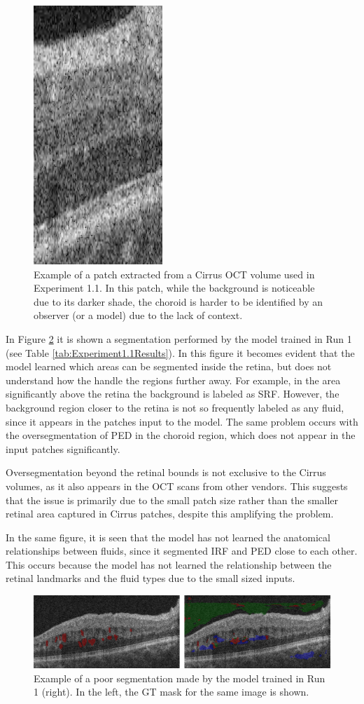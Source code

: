 \begin{figure}[!ht]
	\centering
	\includegraphics[width=0.18\linewidth]{figures/CirrusPatchExample.png}
	\caption{Example of a patch extracted from a Cirrus OCT volume used in Experiment 1.1. In this patch, while the background is noticeable due to its darker shade, the choroid is harder to be identified by an observer (or a model) due to the lack of context.}
	\label{fig:CirrusPatchExample}
\end{figure}

In Figure \ref{fig:Experiment11Segmentation} it is shown a segmentation performed by the model trained in Run 1 (see Table \ref{tab:Experiment1.1Results}). In this figure it becomes evident that the model learned which areas can be segmented inside the retina, but does not understand how the handle the regions further away. For example, in the area significantly above the retina the background is labeled as SRF. However, the background region closer to the retina is not so frequently labeled as any fluid, since it appears in the patches input to the model. The same problem occurs with the oversegmentation of PED in the choroid region, which does not appear in the input patches significantly.
\par
Oversegmentation beyond the retinal bounds is not exclusive to the Cirrus volumes, as it also appears in the OCT scans from other vendors. This suggests that the issue is primarily due to the small patch size rather than the smaller retinal area captured in Cirrus patches, despite this amplifying the problem. 
\par
In the same figure, it is seen that the model has not learned the anatomical relationships between fluids, since it segmented IRF and PED close to each other. This occurs because the model has not learned the relationship between the retinal landmarks and the fluid types due to the small sized inputs.

\begin{figure}[!ht]
	\centering
	\includegraphics[width=1.0\linewidth]{figures/Experiment11Segmentation.png}
	\caption{Example of a poor segmentation made by the model trained in Run 1 (right). In the left, the GT mask for the same image is shown.}
	\label{fig:Experiment11Segmentation}
\end{figure}

